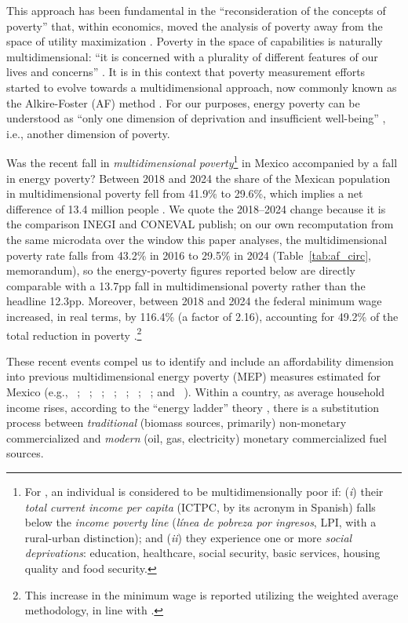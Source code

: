 \documentclass[11pt, a4paper]{article}
\newcommand{\citealp}[1]{\citeauthor{#1}~\citeyear{#1}}
\begin{document}
This approach has been fundamental in the ``reconsideration of the concepts of poverty'' \parencite[p. 9]{jenkins2007} that, within economics, moved the analysis of poverty away from the space of utility maximization \parencite[p. 5]{alkire2015}. Poverty in the space of capabilities is naturally multidimensional: ``it is concerned with a plurality of different features of our lives and concerns'' \parencite[p. 233]{sen2011}. It is in this context that poverty measurement efforts started to evolve towards a multidimensional approach, now commonly known as the Alkire-Foster (AF) method \parencite{alkire2011, alkire2010}. For our purposes, energy poverty can be understood as ``only one dimension of deprivation and insufficient well-being'' \parencite[p. 1]{pelz2018}, i.e., another dimension of poverty. 

Was the recent fall in \textit{multidimensional poverty}\footnote{For \textcite{coneval2019}, an individual is considered to be multidimensionally poor if: (\textit{i}) their \textit{total current income per capita} (ICTPC, by its acronym in Spanish) falls below the \textit{income poverty line} (\textit{línea de pobreza por ingresos}, LPI, with a rural-urban distinction); and (\textit{ii}) they experience one or more \textit{social deprivations}: education, healthcare, social security, basic services, housing quality and food security.} in Mexico accompanied by a fall in energy poverty? Between 2018 and 2024 the share of the Mexican population in multidimensional poverty fell from 41.9\% to 29.6\%, which implies a net difference of 13.4 million people \parencite{zotero-item-1075}. We quote the 2018--2024 change because it is the comparison INEGI and CONEVAL publish; on our own recomputation from the same microdata over the window this paper analyses, the multidimensional poverty rate falls from 43.2\% in 2016 to 29.5\% in 2024 (Table~\ref{tab:af_circ}, memorandum), so the energy-poverty figures reported below are directly comparable with a 13.7pp fall in multidimensional poverty rather than the headline 12.3pp. Moreover, between 2018 and 2024 the federal minimum wage increased, in real terms, by 116.4\% (a factor of 2.16), accounting for 49.2\% of the total reduction in poverty \parencite[p. 7]{zotero-item-1074}.\footnote{This increase in the minimum wage is reported utilizing the weighted average methodology, in line with \textcite{conasami2023}.}

These recent events compel us to identify and include an affordability dimension into previous multidimensional energy poverty (MEP) measures estimated for Mexico (e.g., \citealp{garciaochoa2016}; \citealp{garcia-ochoa2016}; \citealp{santillan2020}; \citealp{robles-bonilla2021}; \citealp{cedano2021}; \citealp{soriano-hernandez2022}; \citealp{jimeneztorres2026}; and \citealp{canto-franco2026}). Within a country, as average household income rises, according to the ``energy ladder'' theory \parencite{vanderkroon2013, waweru2022}, there is a substitution process between \textit{traditional} (biomass sources, primarily) non-monetary commercialized and \textit{modern} (oil, gas, electricity) monetary commercialized fuel sources. 
\end{document}
